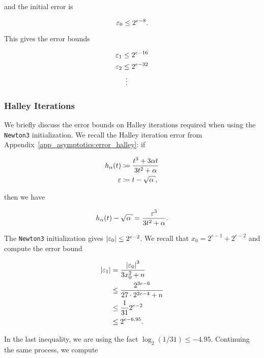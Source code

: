 \noindent
and the initial error is

\begin{equation}
    \varepsilon_{0} \le 2^{e-8}.
\end{equation}

\noindent
This gives the error bounds

\begin{align}
    \varepsilon_{1} &\le 2^{e-16} \nonumber\\
    \varepsilon_{2} &\le 2^{e-32} \nonumber\\
        &\ \vdots
\end{align}


\subsubsection{Halley Iterations}
\label{app:error_bounds:halley}

We briefly discuss the error bounds on Halley iterations required
when using the \texttt{Newton3} initialization.
We recall the Halley iteration error
from Appendix~\ref{app_asymptotics:error_halley}:
if

\begin{align}
    h_{\alpha}(t) &\algAssign{} \frac{t^{3} + 3\alpha t}{3t^{2} + \alpha}
        \nonumber\\
    \eps &\algAssign{} t - \sqrt{\alpha},
\end{align}

\noindent
then we have

\begin{equation}
    h_{\alpha}(t) - \sqrt{\alpha} = \frac{\eps^{3}}{3t^{2} + \alpha}.
\end{equation}

The \texttt{Newton3} initialization gives $\left| \varepsilon_{0} \right| \le 2^{e-2}$.
We recall that $x_{0} = 2^{e-1} + 2^{e-2}$
and compute the error bound

\begin{align}
    \left| \varepsilon_{1} \right| &= \frac{\left| \varepsilon_{0} \right|^{3}}{3x_{0}^{2} + n} \nonumber\\
        &\le \frac{2^{3e-6}}{27\cdot2^{2e-4} + n} \nonumber\\
        &\le \frac{1}{31}2^{e-2} \nonumber\\
        &\le 2^{e-6.95}.
\end{align}

\noindent
In the last inequality, we are using the fact
$\log_{2}(1/31) \le -4.95$.
Continuing the same process,
we compute

